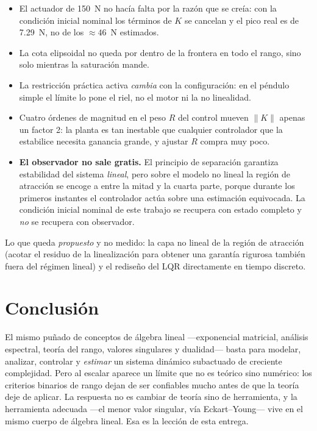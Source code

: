\documentclass[11pt,letterpaper]{article}
\begin{document}
\begin{itemize}
  \item El actuador de 150~N no hacía falta por la razón que se creía: con la
  condición inicial nominal los términos de $K$ se cancelan y el pico real es de
  7.29~N, no de los $\approx46$~N estimados.
  \item La cota elipsoidal no queda por dentro de la frontera en todo el rango,
  sino solo mientras la saturación mande.
  \item La restricción práctica activa \emph{cambia} con la configuración: en el
  péndulo simple el límite lo pone el riel, no el motor ni la no linealidad.
  \item Cuatro órdenes de magnitud en el peso $R$ del control mueven $\|K\|$
  apenas un factor 2: la planta es tan inestable que cualquier controlador que
  la estabilice necesita ganancia grande, y ajustar $R$ compra muy poco.
  \item \textbf{El observador no sale gratis.} El principio de separación
  garantiza estabilidad del sistema \emph{lineal}, pero sobre el modelo no
  lineal la región de atracción se encoge a entre la mitad y la cuarta parte,
  porque durante los primeros instantes el controlador actúa sobre una
  estimación equivocada. La condición inicial nominal de este trabajo se
  recupera con estado completo y \emph{no} se recupera con observador.
\end{itemize}

Lo que queda \emph{propuesto} y no medido: la capa no lineal de la región de
atracción (acotar el residuo de la linealización para obtener una garantía
rigurosa también fuera del régimen lineal) y el rediseño del LQR directamente en
tiempo discreto.

\section{Conclusión}

El mismo puñado de conceptos de álgebra lineal ---exponencial matricial,
análisis espectral, teoría del rango, valores singulares y dualidad--- basta
para modelar, analizar, controlar y \emph{estimar} un sistema dinámico
subactuado de creciente complejidad. Pero al escalar aparece un límite que no es
teórico sino numérico: los criterios binarios de rango dejan de ser confiables
mucho antes de que la teoría deje de aplicar. La respuesta no es cambiar de
teoría sino de herramienta, y la herramienta adecuada ---el menor valor singular,
vía Eckart--Young--- vive en el mismo cuerpo de álgebra lineal. Esa es la
lección de esta entrega.
\end{document}
